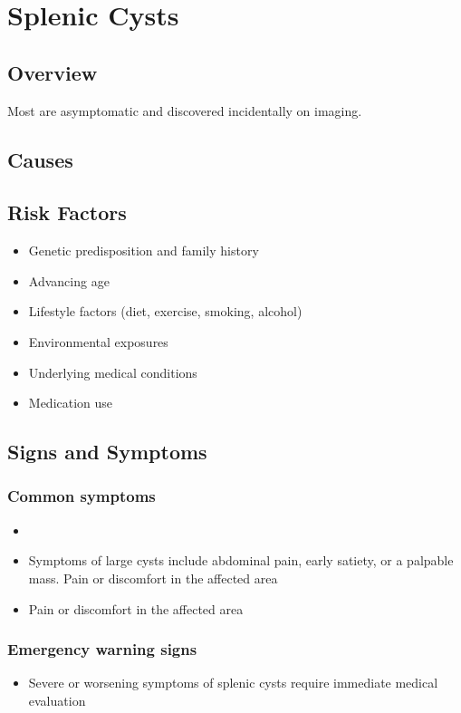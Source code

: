 \chapter{Splenic Cysts}
\label{sec:Splenic Cysts}

\section{Overview}
Most are asymptomatic and discovered incidentally on imaging.
\section{Causes}
\section{Risk Factors}

\begin{itemize}[noitemsep]
  \item Genetic predisposition and family history
  \item Advancing age
  \item Lifestyle factors (diet, exercise, smoking, alcohol)
  \item Environmental exposures
  \item Underlying medical conditions
  \item Medication use
\end{itemize}
\section{Signs and Symptoms}

\subsection{Common symptoms}
\begin{itemize}[noitemsep]
  \item \item Symptoms of large cysts include abdominal pain, early satiety, or a palpable mass. Pain or discomfort in the affected area    \item Pain or discomfort in the affected area
  \end{itemize}

\subsection{Emergency warning signs}
\begin{itemize}[noitemsep]
  \item Severe or worsening symptoms of splenic cysts require immediate medical evaluation
\end{itemize}
